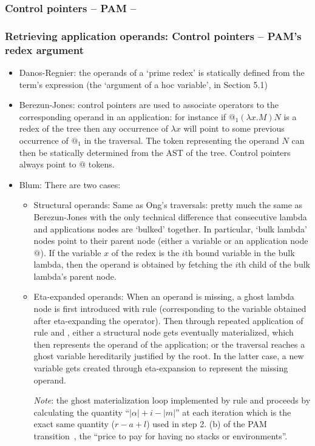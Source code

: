 \documentclass{article}
\theoremstyle{definition}
\newcommand{\ghostlmd}{{\lambda\!\!\lambda}}
\begin{document}
\subsubsection{Control pointers -- PAM -- }

\subsubsection{Retrieving application operands: Control pointers -- PAM's redex argument }
\begin{itemize}
  \item Danos-Regnier: the operands of a `prime redex' is statically defined from the term's expression (the `argument of a hoc variable', in Section 5.1)

  \item Berezun-Jones: control pointers are used to associate operators to the corresponding operand in an application: for instance if $@_1 (\lambda x .M) N$ is a redex of the tree then any occurrence of $\lambda x$ will point to some previous occurrence of $@_1$ in the traversal. The token representing the operand $N$ can then be statically determined from the AST of the tree.
      Control pointers always point to $@$ tokens.

  \item Blum: There are two cases:
     \begin{itemize}
     \item Structural operands: Same as Ong's traversals: pretty much the same as Berezun-Jones with the only technical difference that consecutive lambda and applications nodes are `bulked' together. In particular, `bulk lambda' nodes point to their parent node (either a variable or an application node $@$). If the variable $x$ of the redex is the $i$th bound variable in the bulk lambda, then the operand is obtained by fetching the $i$th child of the bulk lambda's parent node.
    \item Eta-expanded operands: When an operand is missing, a ghost lambda node is first introduced with rule  (corresponding to the variable obtained after eta-expanding the operator). Then through repeated application of rule
        \rulenamet{Lam^\ghostlmd} and , either a structural node gets eventually materialized, which then represents the operand of the application; or the traversal reaches a ghost variable hereditarily justified by the root. In the latter case, a new variable gets created through eta-expansion to represent the missing operand.

        \emph{Note}: the ghost materialization loop implemented by rule \rulenamet{Lam^\ghostlmd} and  proceeds by calculating the quantity ``$|\alpha|+i-|m|$'' at each iteration which is the exact same quantity ($r-a+l$) used in step 2. (b) of the PAM transition~\cite{danos-head}, the ``price to pay for having no stacks or environments''.
    \end{itemize}

\end{itemize}
\end{document}
